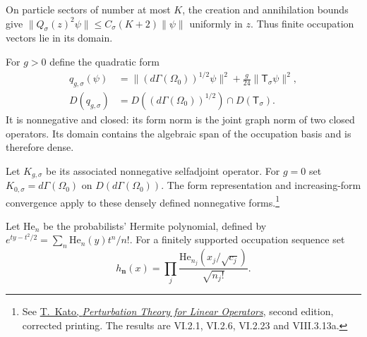 On particle sectors of number at most $K$, the creation and
annihilation bounds give
$\|Q_\sigma(z)^2\psi\|\leq C_\sigma(K+2)\|\psi\|$ uniformly in $z$.
Thus finite occupation vectors lie in its domain.

For $g>0$ define the quadratic form
\begin{equation}\label{mht:eq:scalar-fock-form}
 \begin{aligned}
 q_{g,\sigma}(\psi)
   &=\|(d\Gamma(\Omega_0))^{1/2}\psi\|^2
       +\frac g{24}\|\mathsf T_\sigma\psi\|^2,\\
 D(q_{g,\sigma})
   &=D((d\Gamma(\Omega_0))^{1/2})\cap D(\mathsf T_\sigma).
 \end{aligned}
\end{equation}
It is nonnegative and closed: its form norm is the joint graph
norm of two closed operators. Its domain contains the algebraic
span of the occupation basis and is therefore dense.

Let $K_{g,\sigma}$ be its
associated nonnegative selfadjoint operator. For $g=0$ set
$K_{0,\sigma}=d\Gamma(\Omega_0)$ on $D(d\Gamma(\Omega_0))$.
The form representation and increasing-form convergence apply
to these densely defined nonnegative forms.\footnote{See
\href{https://webhomes.maths.ed.ac.uk/~v1ranick/papers/kato1.pdf}
{T.~Kato, \emph{Perturbation Theory for Linear Operators}}, second
edition, corrected printing. The results are VI.2.1, VI.2.6,
VI.2.23 and VIII.3.13a.}

Let $\mathrm{He}_n$ be the probabilists' Hermite polynomial, defined by
$e^{ty-t^2/2}=\sum_n\mathrm{He}_n(y)t^n/n!$. For a finitely supported
occupation sequence set
\[
 h_{\mathbf n}(x)=\prod_j
       \frac{\mathrm{He}_{n_j}(x_j/\sqrt{c_j})}{\sqrt{n_j!}}.
\]

